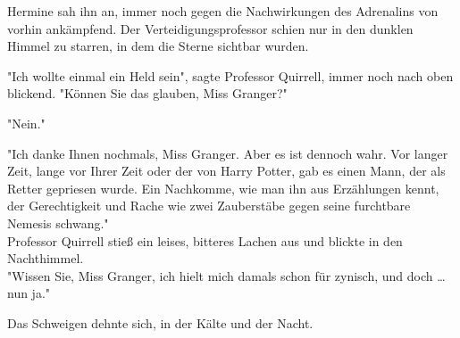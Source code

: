 {Hermine sah ihn an, immer noch gegen die Nachwirkungen des Adrenalins von vorhin ankämpfend. Der Verteidigungsprofessor schien nur in den dunklen Himmel zu starren, in dem die Sterne sichtbar wurden.

"Ich wollte einmal ein Held sein", sagte Professor Quirrell, immer noch nach oben blickend. "Können Sie das glauben, Miss Granger?"

"Nein."

"Ich danke Ihnen nochmals, Miss Granger. Aber es ist dennoch wahr. Vor langer Zeit, lange vor Ihrer Zeit oder der von Harry Potter, gab es einen Mann, der als Retter gepriesen wurde. Ein Nachkomme, wie man ihn aus Erzählungen kennt, der Gerechtigkeit und Rache wie zwei Zauberstäbe gegen seine furchtbare Nemesis schwang."\\ Professor Quirrell stieß ein leises, bitteres Lachen aus und blickte in den Nachthimmel.\\ "Wissen Sie, Miss Granger, ich hielt mich damals schon für zynisch, und doch … nun ja."

Das Schweigen dehnte sich, in der Kälte und der Nacht.

}

